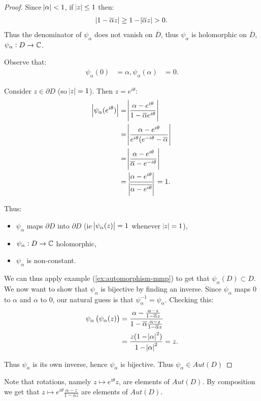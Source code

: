 \begin{proof}
Since $\abs{\alpha} <1$, if $\abs{z} \leq 1$ then:
\begin{align*}
    \abs{1- \overline{\alpha } z} \geq 1 - \abs{\overline{\alpha } z } > 0.
\end{align*}
Thus the denominator of $\psi_\alpha$ does not vanish on $\overline{D}$, thus $\psi_\alpha$ is holomorphic on $\overline{D}$, $\psi_\alpha : D \to \mathbb{C}$.

Observe that:
\begin{align*}
    \psi_\alpha(0) &= \alpha,
    \psi_\alpha(\alpha) &= 0.
\end{align*}

Consider $z \in \partial D$ (so $\abs{z} = 1$). Then $z = e^{i\theta}$:
\begin{align*}
    \abs{\psi_\alpha(e^{i \theta} )} &= \abs{\frac{\alpha - e^{i \theta}}{1 - \overline{\alpha} e^{i \theta}}}\\
    &= \abs{ \frac{\alpha - e^{i\theta}}{ e^{i \theta} ( e^{ - i \theta} - \overline{\alpha}}}\\
    &= \abs{\frac{\alpha - e^{i \theta}}{\overline{\alpha} - e^{- i \theta}}}\\ &= \frac{ \abs{\alpha - e^{i \theta}}  } { \abs{\overline{\alpha - e^{ i \theta}}}} = 1.
\end{align*}

Thus:
\begin{itemize}
    \item $\psi_\alpha$ maps $\partial D$ into $\partial D$ (ie $\abs{\psi_\alpha(z)} = 1$ whenever $\abs{z} = 1$),
    \item $\psi_\alpha : D \to \mathbb{C}$ holomorphic,
    \item $\psi_\alpha$ is non-constant.
\end{itemize}

We can thus apply example (\ref{ex:automorphism-mmp}) to get that $\psi_\alpha (D) \subset D$. We now want to show that $\psi_\alpha$ is bijective by finding an inverse. Since $\psi_\alpha$ maps $0$ to $\alpha$ and $\alpha$ to $0$, our natural guess is that $\psi_\alpha^{-1} = \psi_\alpha$. Checking this:
\begin{align*}
\psi_\alpha \left( \psi_\alpha(z) \right) &= \frac{\alpha - \frac{\alpha - z}{1- \overline{\alpha } z} }{1 - \overline{\alpha} \frac{\alpha - z}{1 - \overline{\alpha} z}}\\
&= \frac{z ( 1- \abs{\alpha} ^2) }{ 1- \abs{\alpha} ^2 } = z.
\end{align*}

Thus $\psi_\alpha$ is its own inverse, hence $\psi_\alpha$ is bijective. Thus $\psi_\alpha \in Aut(D)$
\end{proof}


\begin{remark}
Note that rotations, namely $z \mapsto e^{i \theta} z$, are elements of $Aut(D)$. By composition we get that $z \mapsto e^{i \theta} \frac{\alpha - z}{ 1 - \overline{\alpha} z}$ are elements of $Aut(D)$. 

\end{remark}












 